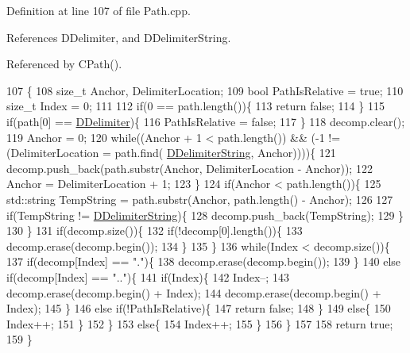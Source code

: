 Definition at line 107 of file Path.\+cpp.



References D\+Delimiter, and D\+Delimiter\+String.



Referenced by C\+Path().


\begin{DoxyCode}
107                                                                               \{
108     \textcolor{keywordtype}{size\_t} Anchor, DelimiterLocation;
109     \textcolor{keywordtype}{bool} PathIsRelative = \textcolor{keyword}{true};
110     \textcolor{keywordtype}{size\_t} Index = 0;
111     
112     \textcolor{keywordflow}{if}(0 == path.length())\{
113         \textcolor{keywordflow}{return} \textcolor{keyword}{false};
114     \}
115     \textcolor{keywordflow}{if}(path[0] == \hyperlink{classCPath_a4af2d74fc7695c4de8900dcc426530b5}{DDelimiter})\{
116         PathIsRelative = \textcolor{keyword}{false};   
117     \}
118     decomp.clear();
119     Anchor = 0;
120     \textcolor{keywordflow}{while}((Anchor + 1 < path.length()) && (-1 != (DelimiterLocation = path.find(
      \hyperlink{classCPath_a88b8652d01ff3359a48dd75126cc5776}{DDelimiterString}, Anchor))))\{
121         decomp.push\_back(path.substr(Anchor, DelimiterLocation - Anchor));
122         Anchor = DelimiterLocation + 1;
123     \}
124     \textcolor{keywordflow}{if}(Anchor < path.length())\{
125         std::string TempString = path.substr(Anchor, path.length() - Anchor);
126 
127         \textcolor{keywordflow}{if}(TempString != \hyperlink{classCPath_a88b8652d01ff3359a48dd75126cc5776}{DDelimiterString})\{
128             decomp.push\_back(TempString);
129         \}
130     \}
131     \textcolor{keywordflow}{if}(decomp.size())\{
132         \textcolor{keywordflow}{if}(!decomp[0].length())\{
133             decomp.erase(decomp.begin());
134         \}
135     \}
136     \textcolor{keywordflow}{while}(Index  < decomp.size())\{
137         \textcolor{keywordflow}{if}(decomp[Index] == \textcolor{stringliteral}{"."})\{
138             decomp.erase(decomp.begin());
139         \}
140         \textcolor{keywordflow}{else} \textcolor{keywordflow}{if}(decomp[Index] == \textcolor{stringliteral}{".."})\{
141             \textcolor{keywordflow}{if}(Index)\{
142                 Index--;
143                 decomp.erase(decomp.begin() + Index);
144                 decomp.erase(decomp.begin() + Index);
145             \}
146             \textcolor{keywordflow}{else} \textcolor{keywordflow}{if}(!PathIsRelative)\{
147                 \textcolor{keywordflow}{return} \textcolor{keyword}{false};
148             \}
149             \textcolor{keywordflow}{else}\{
150                 Index++;
151             \}
152         \}
153         \textcolor{keywordflow}{else}\{
154             Index++;
155         \}
156     \}    
157     
158     \textcolor{keywordflow}{return} \textcolor{keyword}{true};
159 \}
\end{DoxyCode}
